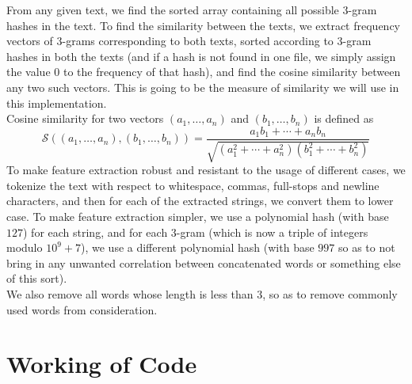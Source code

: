 \documentclass{article}
\begin{document}
From any given text, we find the sorted array containing all possible $3$-gram hashes in the text. To find the similarity between the texts, we extract frequency vectors of $3$-grams corresponding to both texts, sorted according to $3$-gram hashes in both the texts (and if a hash is not found in one file, we simply assign the value 0 to the frequency of that hash), and find the cosine similarity between any two such vectors. This is going to be the measure of similarity we will use in this implementation.\\
Cosine similarity for two vectors $(a_1, \dots, a_n)$ and $(b_1, \dots, b_n)$ is defined as $$\mathcal{S}((a_1, \dots, a_n), (b_1, \dots, b_n)) = \frac{a_1b_1 + \cdots + a_nb_n}{\sqrt{(a_1^2 + \cdots + a_n^2)(b_1^2 + \cdots + b_n^2)}}$$
To make feature extraction robust and resistant to the usage of different cases, we tokenize the text with respect to whitespace, commas, full-stops and newline characters, and then for each of the extracted strings, we convert them to lower case.
To make feature extraction simpler, we use a polynomial hash (with base $127$) for each string, and for each $3$-gram (which is now a triple of integers modulo $10^9 + 7$), we use a different polynomial hash (with base $997$ so as to not bring in any unwanted correlation between concatenated words or something else of this sort).\\
We also remove all words whose length is less than 3, so as to remove commonly used words from consideration.

\section*{Working of Code}
\end{document}
